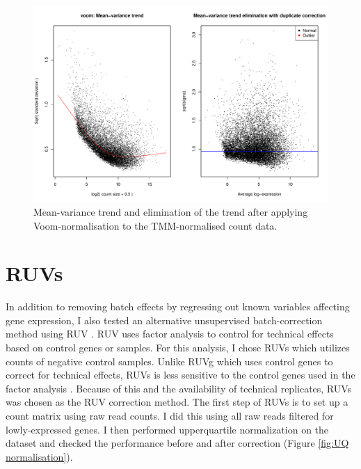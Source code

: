\documentclass[12pt,a4paper,titlepage,twoside,openright]{book}
\begin{document}
\begin{mainmatter}
{{\begin{figure}[htb!]
\centering
\includegraphics[width=\textwidth,height=\textheight,keepaspectratio]{Figures/Limma_voomDuplicateCorrelation_TMMNormalisation.pdf}
\caption{Mean-variance trend and elimination of the trend after applying Voom-normalisation to the TMM-normalised count data.}
\label{fig:Voom normalisation}
\end{figure}

\section{RUVs}
In addition to removing batch effects by regressing out known variables affecting gene expression, I also tested an alternative unsupervised batch-correction method using RUV \cite{gagnon2012using, risso2014normalization}. RUV uses factor analysis to control for technical effects based on control genes or samples. For this analysis, I chose RUVs which utilizes counts of negative control samples. Unlike RUVg which uses control genes to correct for technical effects, RUVs is less sensitive to the control genes used in the factor analysis \cite{risso2014normalization}. Because of this and the availability of technical replicates, RUVs was chosen as the RUV correction method. 
The first step of RUVs is to set up a count matrix using raw read counts. I did this using all raw reads filtered for lowly-expressed genes. I then performed upperquartile normalization on the dataset and checked the performance before and after correction (﻿Figure \ref{fig:UQ normalisation}﻿). 

}}
\end{mainmatter}
\end{document}
